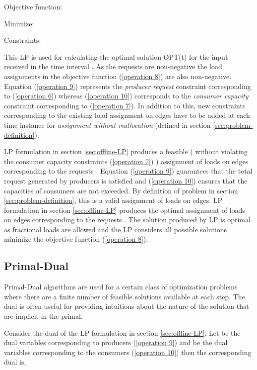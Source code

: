 \documentclass{llncs}
\begin{document}
Objective function:

Minimize:


Constraints:




This LP is used for calculating the optimal solution OPT(t) for the input received in the time interval . As the requests  are non-negative the load assignments  in the objective function (\ref{operation 8}) are also non-negative. Equation (\ref{operation 9}) represents the \emph{producer request} constraint corresponding to (\ref{operation 6}) whereas (\ref{operation 10}) corresponds to the \emph{consumer capacity} constraint corresponding to (\ref{operation 7}). In addition to this, new constraints corresponding to the existing load assignment on edges have to be added at each time instance  for \emph{assignment without reallocation} (defined in section \ref{sec:problem-definition}).

LP formulation in section \ref{sec:offline-LP} produces a feasible \big( without violating the consumer capacity constraints (\ref{operation 7}) \big) assignment of loads  on edges  corresponding to the requests . Equation (\ref{operation 9}) guarantees that the total request generated by producers  is satisfied and (\ref{operation 10}) ensures that the capacities of consumers  are not exceeded. By definition of problem in section \ref{sec:problem-definition}, this is a valid assignment of loads on edges. LP formulation in section \ref{sec:offline-LP} produces the optimal assignment of loads  on edges  corresponding to the requests . The solution produced by LP is optimal as fractional loads are allowed and the LP considers all possible solutions minimize the objective function (\ref{operation 8}). 

\subsection{Primal-Dual}
\label{sec:offline-PD}
Primal-Dual algorithms are used for a certain class of optimization problems where there are a finite number of feasible solutions available at each step. The dual is often useful for providing intuitions about the nature of the solution that are implicit in the primal.

Consider the dual of the LP formulation in section \ref{sec:offline-LP}. Let  be the dual variables corresponding to producers  (\ref{operation 9}) and  be the dual variables corresponding to the consumers  (\ref{operation 10}) then the corresponding dual is,
\end{document}
